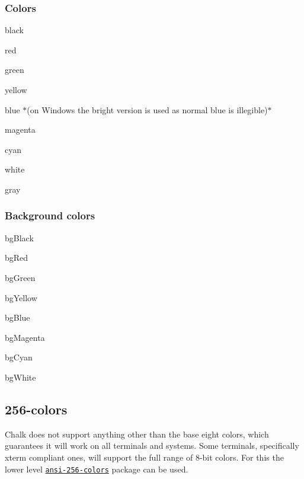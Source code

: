 \subsubsection*{Colors}


\begin{DoxyItemize}
\item {\ttfamily black}
\item {\ttfamily red}
\item {\ttfamily green}
\item {\ttfamily yellow}
\item {\ttfamily blue} $\ast$(on Windows the bright version is used as normal blue is illegible)$\ast$
\item {\ttfamily magenta}
\item {\ttfamily cyan}
\item {\ttfamily white}
\item {\ttfamily gray}
\end{DoxyItemize}

\subsubsection*{Background colors}


\begin{DoxyItemize}
\item {\ttfamily bg\+Black}
\item {\ttfamily bg\+Red}
\item {\ttfamily bg\+Green}
\item {\ttfamily bg\+Yellow}
\item {\ttfamily bg\+Blue}
\item {\ttfamily bg\+Magenta}
\item {\ttfamily bg\+Cyan}
\item {\ttfamily bg\+White}
\end{DoxyItemize}

\subsection*{256-\/colors}

Chalk does not support anything other than the base eight colors, which guarantees it will work on all terminals and systems. Some terminals, specifically {\ttfamily xterm} compliant ones, will support the full range of 8-\/bit colors. For this the lower level \href{https://github.com/jbnicolai/ansi-256-colors}{\tt ansi-\/256-\/colors} package can be used.

